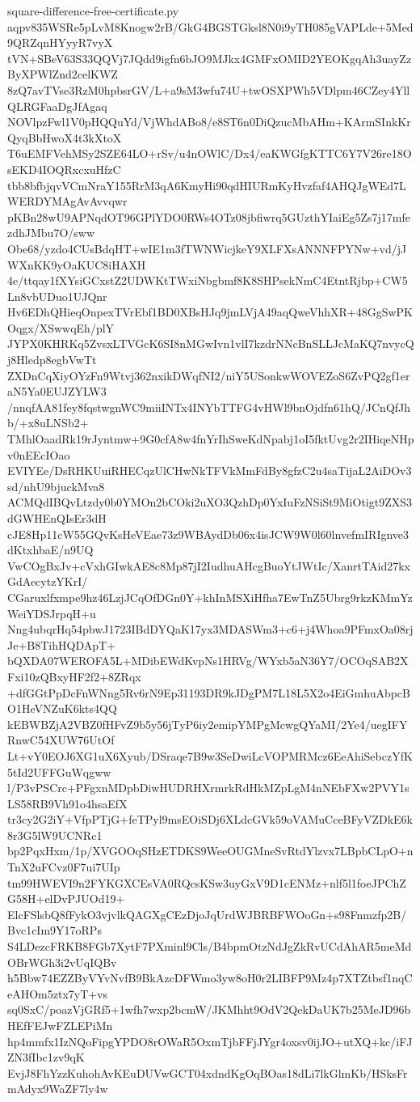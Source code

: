 \documentclass[11pt]{article}
\theoremstyle{definition}
\theoremstyle{remark}
\begin{document}
\begin{filecontents*}[overwrite]{square-difference-free-certificate.py}
aqpv835WSRe5pLvM8Knogw2rB/GkG4BGSTGksl8N0i9yTH085gVAPLde+5Med9QRZqnHYyyR7vyX
tVN+SBeV63S33QQVj7JQdd9igfn6bJO9MJkx4GMFxOMID2YEOKgqAh3uayZzByXPWlZnd2celKWZ
8zQ7avTVse3RzM0hpbsrGV/L+a9sM3wfu74U+twOSXPWh5VDlpm46CZey4YllQLRGFaaDgJfAgaq
NOVlpzFwl1V0pHQQuYd/VjWhdABo8/e8ST6n0DiQzucMbAHm+KArmSInkKrQyqBbHwoX4t3kXtoX
T6uEMFVehMSy2SZE64LO+rSv/u4nOWlC/Dx4/eaKWGfgKTTC6Y7V26re18OsEKD4IOQRxcxuHfzC
tbb8bfbjqvVCmNraY155RrM3qA6KmyHi90qdHIURmKyHvzfaf4AHQJgWEd7LWERDYMAgAvAvvqwr
pKBn28wU9APNqdOT96GPlYDO0RWs4OTz08jbfiwrq5GUzthYIaiEg5Zs7j17mfezdhJMbu7O/sww
Obe68/yzdo4CUsBdqHT+wIE1m3fTWNWicjkeY9XLFXsANNNFPYNw+vd/jJWXnKK9yOaKUC8iHAXH
4e/ttqay1fXYsiGCxstZ2UDWKtTWxiNbgbmf8K8SHPsekNmC4EtntRjbp+CW5Ln8vbUDuo1UJQnr
Hv6EDhQHieqOnpexTVrEbf1BD0XBsHJq9jmLVjA49aqQweVhhXR+48GgSwPKOqgx/XSwwqEh/plY
JYPX0KHRKq5ZvsxLTVGcK6SI8nMGwIvn1vlI7kzdrNNcBnSLLJcMaKQ7nvycQj8Hledp8egbVwTt
ZXDnCqXiyOYzFn9Wtvj362nxikDWqfNI2/niY5USonkwWOVEZoS6ZvPQ2gf1eraN5Ya0EUJZYLW3
/nnqfAA81fey8fqstwgnWC9miiINTx4INYbTTFG4vHWl9bnOjdfn61hQ/JCnQfJhb/+x8uLNSb2+
TMhlOaadRk19rJyntmw+9G0cfA8w4fnYrIhSweKdNpabj1oI5fktUvg2r2IHiqeNHpv0nEEcIOao
EVIYEe/DsRHKUuiRHECqzUlCHwNkTFVkMmFdBy8gfzC2u4saTijaL2AiDOv3sd/nhU9bjuckMva8
ACMQdIBQvLtzdy0b0YMOn2bCOki2uXO3QzhDp0YxIuFzNSiSt9MiOtigt9ZXS3dGWHEnQIsEr3dH
cJE8Hp11cW55GQvKsHeVEae73z9WBAydDb06x4isJCW9W0l60lnvefmIRIgnve3dKtxhbaE/n9UQ
VwCOgBxJv+cVxhGIwkAE8c8Mp87jI2IudhuAHcgBuoYtJWtIc/XanrtTAid27kxGdAecytzYKrI/
CGaruxlfxmpe9hz46LzjJCqOfDGn0Y+khInMSXiHfha7EwTnZ5Ubrg9rkzKMmYzWeiYDSJrpqH+u
Nng4ubqrHq54pbwJ1723IBdDYQaK17yx3MDASWm3+c6+j4Whoa9PFmxOa08rjJe+B8TihHQDApT+
bQXDA07WEROFA5L+MDibEWdKvpNs1HRVg/WYxb5aN36Y7/OCOqSAB2XFxi10zQBxyHF2f2+8ZRqx
+dfGGtPpDcFnWNng5Rv6rN9Ep31193DR9kJDgPM7L18L5X2o4EiGmhuAbpcBO1HeVNZuK6kts4QQ
kEBWBZjA2VBZ0fHFvZ9b5y56jTyP6iy2emipYMPgMcwgQYaMI/2Ye4/uegIFYRnwC54XUW76UtOf
Lt+vY0EOJ6XG1uX6Xyub/DSraqe7B9w3SeDwiLcVOPMRMcz6EeAhiSebczYfK5tId2UFFGuWqgww
l/P3vPSCrc+PFgxnMDpbDiwHUDRHXrmrkRdHkMZpLgM4nNEbFXw2PVY1sLS58RB9Vh91o4hsaEfX
tr3cy2G2iY+VfpPTjG+feTPyl9msEOiSDj6XLdcGVk59oVAMuCceBFyVZDkE6k8r3G5lW9UCNRc1
bp2PqxHxm/1p/XVGOOqSHzETDKS9WeeOUGMneSvRtdYlzvx7LBpbCLpO+nTnX2uFCvz0F7ui7UIp
tm99HWEVI9n2FYKGXCEsVA0RQcsKSw3uyGxV9D1cENMz+nlf5l1foeJPChZG58H+elDvPJUOd19+
ElcFSlsbQ8fFykO3vjvlkQAGXgCEzDjoJqUrdWJBRBFWOoGn+s98Fnmzfp2B/Bvc1cIm9Y17oRPs
S4LDezcFRKB8FGb7XytF7PXminl9Cls/B4bpmOtzNdJgZkRvUCdAhAR5meMdOBrWGh3i2vUqIQBv
h5Bbw74EZZByVYvNvfB9BkAzcDFWmo3yw8oH0r2LIBFP9Mz4p7XTZtbsf1nqCeAHOm5ztx7yT+vs
sq0SxC/poazVjGRf5+1wfh7wxp2bcmW/JKMhht9OdV2QekDaUK7b25MeJD96bHEfFEJwFZLEPiMn
hp4mmfx1IzNQoFipgYPDO8rOWaR5OxmTjbFFjJYgr4oxsv0ijJO+utXQ+kc/iFJZN3fIbc1zv9qK
EvjJ8FhYzzKuhohAvKEuDUVwGCT04xdndKgOqBOas18dLi7lkGlmKb/HSksFrmAdyx9WaZF7ly4w

\end{filecontents*}
\end{document}
